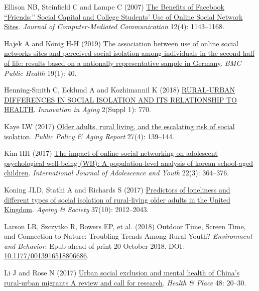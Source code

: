 \documentclass[
  letterpaper,
  DIV=11,
  numbers=noendperiod]{scrartcl}
\newlength{\cslhangindent}
\newlength{\cslentryspacingunit} %
\newenvironment{CSLReferences}[2] %
 {%
  \setlength{\parindent}{0pt}
  \ifodd #1
  \let\oldpar\par
  \def\par{\hangindent=\cslhangindent\oldpar}
  \fi
  \setlength{\parskip}{#2\cslentryspacingunit}
 }%
 {}
\begin{document}
\begin{CSLReferences}{1}{0}
\leavevmode{}%
Ellison NB, Steinfield C and Lampe C (2007)
\href{https://doi.org/10.1111/j.1083-6101.2007.00367.x}{The Benefits of
Facebook {``}Friends:{''} Social Capital and College Students{'} Use of
Online Social Network Sites}. \emph{Journal of Computer-Mediated
Communication} 12(4): 1143--1168.

\leavevmode{}%
Hajek A and König H-H (2019)
\href{https://doi.org/10.1186/s12889-018-6369-6}{The association between
use of online social networks sites and perceived social isolation among
individuals in the second half of life: results based on a nationally
representative sample in Germany}. \emph{BMC Public Health} 19(1): 40.

\leavevmode{}%
Henning-Smith C, Ecklund A and Kozhimannil K (2018)
\href{https://doi.org/10.1093/geroni/igy023.2851}{RURAL-URBAN
DIFFERENCES IN SOCIAL ISOLATION AND ITS RELATIONSHIP TO HEALTH}.
\emph{Innovation in Aging} 2(Suppl 1): 770.

\leavevmode{}%
Kaye LW (2017) \href{https://doi.org/10.1093/ppar/prx029}{Older adults,
rural living, and the escalating risk of social isolation}. \emph{Public
Policy \& Aging Report} 27(4): 139--144.

\leavevmode{}%
Kim HH (2017) \href{https://doi.org/10.1080/02673843.2016.1197135}{The
impact of online social networking on adolescent psychological
well-being (WB): A population-level analysis of korean school-aged
children}. \emph{International Journal of Adolescence and Youth} 22(3):
364--376.

\leavevmode{}%
Koning JLD, Stathi A and Richards S (2017)
\href{https://doi.org/10.1017/S0144686X16000696}{Predictors of
loneliness and different types of social isolation of rural-living older
adults in the United Kingdom}. \emph{Ageing \& Society} 37(10):
2012--2043.

\leavevmode{}%
Larson LR, Szczytko R, Bowers EP, et al. (2018) Outdoor Time, Screen
Time, and Connection to Nature: Troubling Trends Among Rural Youth?
\emph{Environment and Behavior}. Epub ahead of print 20 October 2018.
DOI:
\href{https://doi.org/10.1177/0013916518806686}{10.1177/0013916518806686}.

\leavevmode{}%
Li J and Rose N (2017)
\href{https://doi.org/10.1016/j.healthplace.2017.08.009}{Urban social
exclusion and mental health of China's rural-urban migrants
{\textendash} A review and call for research}. \emph{Health \& Place}
48: 20--30.


\end{CSLReferences}
\end{document}
